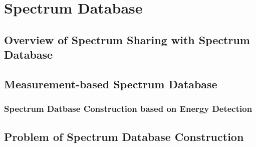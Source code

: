 \chapter[Spectrum Database]{Spectrum Database}
\label{chapter:Database}
\section{Overview of Spectrum Sharing with Spectrum Database}

\section{Measurement-based Spectrum Database}
    \subsection{Spectrum Datbase Construction based on Energy Detection}

\section{Problem of Spectrum Database Construction }


